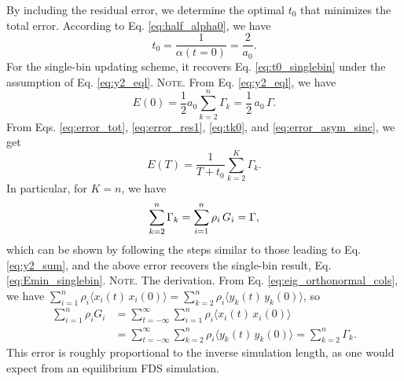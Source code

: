\documentclass[reprint, superscriptaddress, floatfix]{revtex4-1}
\newcommand{\note}[1]{{\color{DarkGreen}\footnotesize \textsc{Note.} #1}}
\newcommand{\Err}{E}
\begin{document}
By including the residual error,
we determine the optimal $t_0$
that minimizes the total error.
%
According to Eq. \eqref{eq:half_alpha0}, we have
%
\begin{equation}
  t_0
  =
  \frac{        1      }
       { \alpha(t = 0) }
  =
  \frac{  2  }
       { a_0 }
  .
\label{eq:t0_sinc}
\end{equation}
%
For the single-bin updating scheme,
it recovers Eq. \eqref{eq:t0_singlebin}
under the assumption of Eq. \eqref{eq:y2_eql}.
%
\note{From Eq. \eqref{eq:y2_eql}, we have
$$E(0) = \frac{1}{2} a_0 \sum_{k=2}^n \Gamma_k = \frac{1}{2} \, a_0 \, \Gamma.$$
}
From Eqs. \eqref{eq:error_tot},
\eqref{eq:error_res1},
\eqref{eq:tk0},
and
\eqref{eq:error_asym_sinc},
we get
%
\begin{equation}
  \Err(T)
  =
  \frac{   1     }
       { T + t_0 }
  \sum_{ k = 2 }^K
    \Gamma_k
  .
\label{eq:error_sinc}
\end{equation}
%
In particular, for $K = n$, we have
\begin{equation}
  \sum_{k=2}^n \Gamma_k
  = \sum_{i=1}^n \rho_i \, G_i = \Gamma
  ,
  \notag
\end{equation}
which can be shown by following the steps
similar to those leading to Eq. \eqref{eq:y2_sum},
and the above error recovers the single-bin result,
Eq. \eqref{eq:Emin_singlebin}.
%
%
%
\note{The derivation.
From Eq. \eqref{eq:eig_orthonormal_cols}, we have
$\sum_{i=1}^n \rho_i \langle x_i(t) \, x_i(0) \rangle
=\sum_{k=2}^n \rho_i \langle y_k(t) \, y_k(0) \rangle$,
so
\begin{align*}
\sum_{i=1}^n \rho_i G_i
&=\sum_{t=-\infty}^\infty\sum_{i=1}^n \rho_i \langle x_i(t) \, x_i(0) \rangle \\
&=\sum_{t=-\infty}^\infty\sum_{k=2}^n \rho_i \langle y_k(t) \, y_k(0) \rangle
=\sum_{k=2}^n \Gamma_k.
\end{align*}
}
%
This error is roughly proportional to the inverse simulation length,
as one would expect from an equilibrium FDS simulation.




%
%
\end{document}
